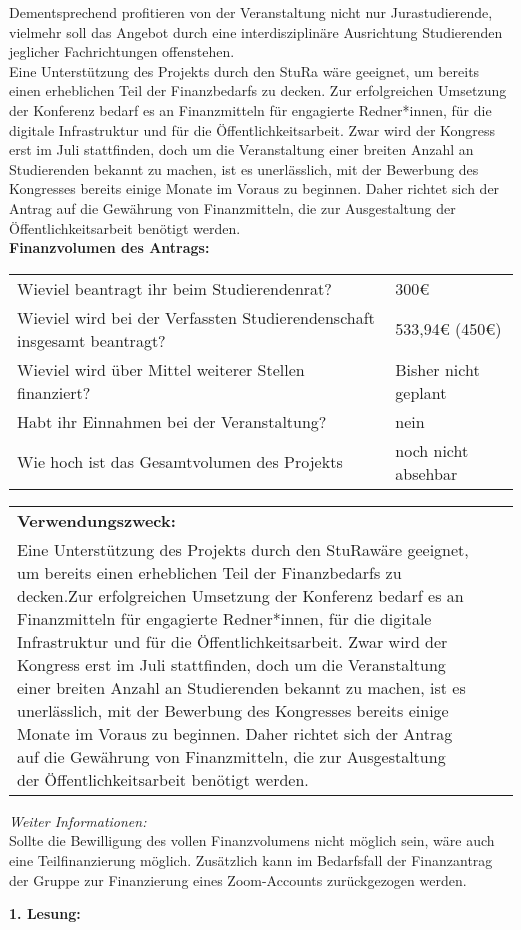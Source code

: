 {    Dementsprechend profitieren von der Veranstaltung nicht nur Jurastudierende, vielmehr soll das Angebot durch eine interdisziplinäre Ausrichtung Studierenden jeglicher Fachrichtungen offenstehen.\\
    Eine Unterstützung des Projekts durch den StuRa wäre geeignet, um bereits einen erheblichen Teil der Finanzbedarfs zu decken.
    Zur erfolgreichen Umsetzung der Konferenz bedarf es an Finanzmitteln für engagierte Redner*innen, für die digitale Infrastruktur und für die Öffentlichkeitsarbeit. Zwar wird der Kongress erst im Juli stattfinden, doch um die Veranstaltung einer breiten Anzahl an Studierenden bekannt zu machen, ist es unerlässlich, mit der Bewerbung des Kongresses bereits einige Monate im Voraus zu beginnen. Daher richtet sich der Antrag auf die Gewährung von Finanzmitteln, die zur Ausgestaltung der Öffentlichkeitsarbeit benötigt werden.\\[1em]
    \textbf{Finanzvolumen des Antrags:}\\
    \begin{tabular}{l l}
        Wieviel beantragt ihr beim Studierendenrat?                             & 300€       \\
        Wieviel wird bei der Verfassten Studierendenschaft insgesamt beantragt? & 533,94€ (450€)    \\
        Wieviel wird über Mittel weiterer Stellen finanziert?                   & Bisher nicht geplant      \\
        Habt ihr Einnahmen bei der Veranstaltung?                               & nein \\
        Wie hoch ist das Gesamtvolumen des Projekts                             & noch nicht absehbar\\
    \end{tabular}
    \newline
    \vspace*{2em}
    \newline
    \begin{tabular}{p{8cm} p{2cm} p{5cm}}
        \textbf{Verwendungszweck:}\\
        Eine Unterstützung des Projekts durch den StuRawäre geeignet, um bereits einen erheblichen Teil der Finanzbedarfs zu decken.Zur erfolgreichen Umsetzung der Konferenz bedarf es an Finanzmitteln für engagierte Redner*innen, für die digitale Infrastruktur und für die Öffentlichkeitsarbeit. Zwar wird der Kongress erst im Juli stattfinden, doch um die Veranstaltung einer breiten Anzahl an Studierenden bekannt zu machen, ist es unerlässlich, mit der Bewerbung des Kongresses bereits einige Monate im Voraus zu beginnen. Daher richtet sich der Antrag auf die Gewährung von Finanzmitteln, die zur Ausgestaltung der Öffentlichkeitsarbeit benötigt werden.
    \end{tabular}
    \emph{Weiter Informationen:}\\
    Sollte die Bewilligung des vollen Finanzvolumens nicht möglich sein, wäre auch eine Teilfinanzierung möglich. Zusätzlich kann im Bedarfsfall der Finanzantrag der Gruppe zur Finanzierung eines Zoom-Accounts zurückgezogen werden.
}{
    \textbf{1. Lesung:}
    \ul{}
}
